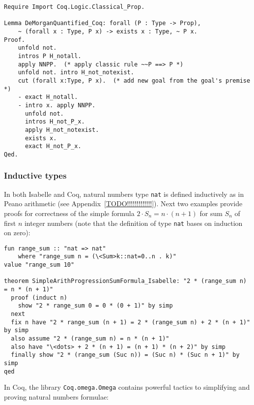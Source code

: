 \documentclass[article]{aaltoseries}
\begin{document}
\begin{lstlisting}[language=coq, caption={Proof of the de Morgan's law for first-order propositions in Coq}, label={ex_morgan_quant_coq}]
Require Import Coq.Logic.Classical_Prop.

Lemma DeMorganQuantified_Coq: forall (P : Type -> Prop), 
    ~ (forall x : Type, P x) -> exists x : Type, ~ P x.
Proof.
    unfold not.
    intros P H_notall.
    apply NNPP.  (* apply classic rule ~~P ==> P *)
    unfold not. intro H_not_notexist.
    cut (forall x:Type, P x).  (* add new goal from the goal's premise *)
    - exact H_notall.
    - intro x. apply NNPP.
      unfold not.
      intros H_not_P_x.
      apply H_not_notexist.
      exists x.
      exact H_not_P_x.
Qed.
\end{lstlisting}



\subsubsection{Inductive types}

In both Isabelle and Coq, natural numbers type \texttt{nat} is defined inductively as in Peano arithmetic (see Appendix~\ref{TODO!!!!!!!!!!!!!}). Next two examples provide proofs for correctness of the simple formula 
$2 \cdot S_{n} = {n \cdot (n + 1)}$ for sum $S_{n}$ of first $n$ integer numbers (note that the definition of type \texttt{nat} bases on induction on zero):

\begin{lstlisting}[language=isabelle, caption={Proof of the formula for sum of n first number in Isabelle}, label={ex_nat_sum_isabelle}]
fun range_sum :: "nat => nat"
	where "range_sum n = (\<Sum>k::nat=0..n . k)"
value "range_sum 10"

theorem SimpleArithProgressionSumFormula_Isabelle: "2 * (range_sum n) = n * (n + 1)"
  proof (induct n)
    show "2 * range_sum 0 = 0 * (0 + 1)" by simp
  next
  fix n have "2 * range_sum (n + 1) = 2 * (range_sum n) + 2 * (n + 1)" by simp
  also assume "2 * (range_sum n) = n * (n + 1)"
  also have "\<dots> + 2 * (n + 1) = (n + 1) * (n + 2)" by simp
  finally show "2 * (range_sum (Suc n)) = (Suc n) * (Suc n + 1)" by simp
qed
\end{lstlisting}


In Coq, the library \texttt{Coq.omega.Omega} contains powerful tactics to simplifying and proving natural numbers formulae:
\end{document}

